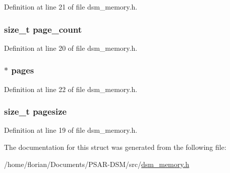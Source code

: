 Definition at line 21 of file dsm\+\_\+memory.\+h.

\subsubsection[{\texorpdfstring{page\+\_\+count}{page_count}}]{\setlength{\rightskip}{0pt plus 5cm}size\+\_\+t page\+\_\+count}\hypertarget{structdsm__memory__s_aa0a18b4e3e172dc4a506562989bbaf70}{}\label{structdsm__memory__s_aa0a18b4e3e172dc4a506562989bbaf70}


Definition at line 20 of file dsm\+\_\+memory.\+h.

\subsubsection[{\texorpdfstring{pages}{pages}}]{$\ast$ pages}\hypertarget{structdsm__memory__s_a3889719ea29b7e6c479d5ecfef645cf4}{}\label{structdsm__memory__s_a3889719ea29b7e6c479d5ecfef645cf4}


Definition at line 22 of file dsm\+\_\+memory.\+h.

\subsubsection[{\texorpdfstring{pagesize}{pagesize}}]{\setlength{\rightskip}{0pt plus 5cm}size\+\_\+t pagesize}\hypertarget{structdsm__memory__s_acf2100606c2cc3ac23a92214e8018a2d}{}\label{structdsm__memory__s_acf2100606c2cc3ac23a92214e8018a2d}


Definition at line 19 of file dsm\+\_\+memory.\+h.



The documentation for this struct was generated from the following file\+:\begin{DoxyCompactItemize}
\item 
/home/florian/\+Documents/\+P\+S\+A\+R-\/\+D\+S\+M/src/\hyperlink{dsm__memory_8h}{dsm\+\_\+memory.\+h}\end{DoxyCompactItemize}
